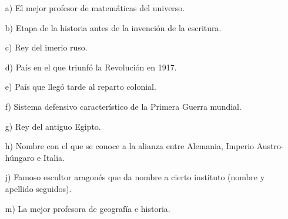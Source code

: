 \documentclass[a4paper]{article}
\begin{document}
\begin{itemize}
	\item[a)] El mejor profesor de matemáticas del universo.
	\item[b)] Etapa de la historia antes de la invención de la escritura.
	\item[c)] Rey del imerio ruso.
	\item[d)] País en el que triunfó la Revolución en 1917.
	\item[e)] País que llegó tarde al reparto colonial.
	\item[f)] Sistema defensivo característico de la Primera Guerra mundial.
	\item[g)] Rey del antiguo Egipto.
	\item[h)] Nombre con el que se conoce a la alianza entre Alemania, Imperio Austro-húngaro e Italia.
	\item[j)] Famoso escultor aragonés que da nombre a cierto instituto (nombre y apellido seguidos).
	\item[m)] La mejor profesora de geografía e historia.
\end{itemize}
\end{document}

